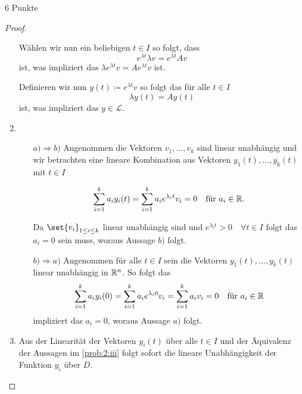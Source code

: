 \documentclass{problemset}
\begin{document}
\begin{problem}[Aufgabe 2]{6 Punkte}
\begin{proof}
\begin{enumerate}
              Wählen wir nun ein beliebigen \(t \in I\) so folgt, dass
              \begin{equation}
                  e^{\lambda t} \lambda v = e^{\lambda t} Av
              \end{equation} ist, was impliziert das \(\lambda e^{\lambda t} v = A e^{\lambda t} v\) ist.

              Definieren wir nun \(y(t) \coloneq e^{\lambda t} v\) so folgt das
              für alle \(t \in I\)
              \begin{equation}
                  \lambda y(t) = A y(t)
              \end{equation} ist, was impliziert das \(y \in \mathcal{L}\).

        \item \leavevmode
              \begin{enumerate}
                  \item [\(a) \Rightarrow b)\)]
                        Angenommen die Vektoren \(v_1, \ldots, v_k\) sind
                        linear unabhängig und wir betrachten eine lineare
                        Kombination aus Vektoren \(y_1(t), \ldots, y_k(t)\) mit
                        \(t \in I\)

                        \begin{equation}
                            \sum_{i=1}^{k} a_i y_i(t) = \sum_{i=1}^{k} a_i e^{\lambda_i t} v_i = 0 \quad \text{für } a_i \in \mathbb{R}.
                        \end{equation}

                        Da \(\set{v_i}_{1 \le i \le k}\) linear unabhängig sind
                        und \(e^{\lambda_i t} > 0 \quad \forall t \in I\) folgt
                        das \(a_i = 0\) sein muss, woraus Aussage \(b)\) folgt.

                  \item [\(b) \Rightarrow a)\)]
                        Angenommen für alle \(t \in I\) sein die Vektoren
                        \(y_1(t), \ldots, y_k(t)\) linear unabhängig in \(\mathbb{R}^n\).
                        So folgt das
                        \begin{equation*}
                            \sum_{i=1}^{k} a_i y_i(0) = \sum_{i=1}^{k} a_i e^{\lambda_i 0} v_i = \sum_{i=1}^{k} a_i v_i = 0 \quad \text{für } a_i \in \mathbb{R}
                        \end{equation*} impliziert das \(a_i = 0\), woraus Aussage \(a)\) folgt.
              \end{enumerate}
        \item Aus der Linearität der Vektoren \(y_i(t)\) über alle \(t \in I\)
              und der Äquivalenz der Aussagen im \autoref{prob:2:iii} folgt
              sofort die lineare Unabhängigkeit der Funktion \(y_i\) über
              \(D\).


\end{enumerate}
\end{proof}
\end{problem}
\end{document}
